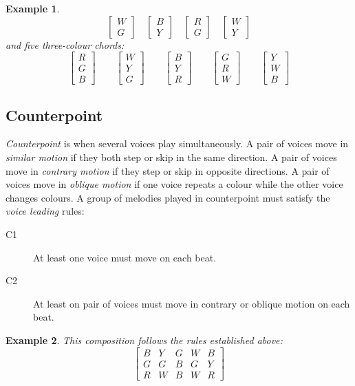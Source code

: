 \documentclass{scrartcl}
\newtheorem{example}{Example}
\begin{document}
\begin{example}
\begin{equation}
\begin{bmatrix}
W \\ G
\end{bmatrix}
\quad
\begin{bmatrix}
B \\ Y
\end{bmatrix}
\quad
\begin{bmatrix}
R \\ G
\end{bmatrix}
\quad
\begin{bmatrix}
W \\ Y
\end{bmatrix}
\end{equation}
and five three-colour chords:
\begin{equation}\nonumber
\begin{bmatrix}
R \\ G \\ B
\end{bmatrix}
\qquad
\begin{bmatrix}
W \\ Y \\ G
\end{bmatrix}
\qquad
\begin{bmatrix}
B \\ Y \\ R
\end{bmatrix}
\qquad
\begin{bmatrix}
G \\ R \\ W
\end{bmatrix}
\qquad
\begin{bmatrix}
Y \\ W \\ B
\end{bmatrix}
\end{equation}
\end{example}

\subsection{Counterpoint}
\emph{Counterpoint} is when several voices play simultaneously. A pair of voices move in \emph{similar motion} if they both step or skip in the same direction. A pair of voices move in \emph{contrary motion} if they step or skip in opposite directions.  A pair of voices move in \emph{oblique motion} if one voice repeats a colour while the other voice changes colours.  A group of melodies played in counterpoint must satisfy the \emph{voice leading} rules:
\begin{description}
	\item[C1] At least one voice must move on each beat.
	\item[C2] At least on pair of voices must move in contrary or oblique motion on each beat.
\end{description}

\begin{example}
This composition follows the rules established above:
\begin{equation}\nonumber
\begin{bmatrix}
	B & Y & G & W & B \\
	G & G & B & G & Y \\
	R & W & B & W & R
\end{bmatrix}
\end{equation}
\end{example}
\end{document}
